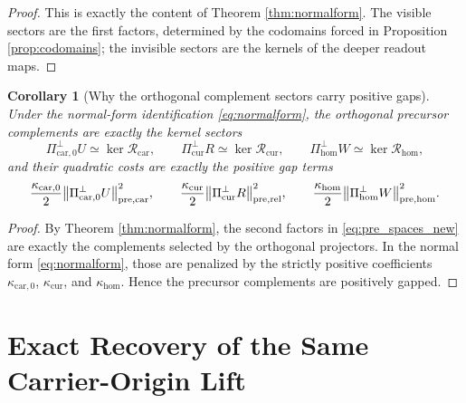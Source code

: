 \documentclass[11pt]{article}
\newcommand{\PreTensor}{U}
\newcommand{\PreRelabel}{R}
\newcommand{\PreFree}{W}
\newcommand{\PreCarPerp}{\Pi_{\mathrm{car},0}^{\perp}}
\newcommand{\CurrentPerp}{\Pi_{\mathrm{cur}}^{\perp}}
\newcommand{\FreeReadPerp}{\Pi_{\mathrm{hom}}^{\perp}}
\newcommand{\PreCarGap}{\kappa_{\mathrm{car},0}}
\newcommand{\CurrentGap}{\kappa_{\mathrm{cur}}}
\newcommand{\HomGap}{\kappa_{\mathrm{hom}}}
\newcommand{\CarRead}{\mathcal R_{\mathrm{car}}}
\newcommand{\CurRead}{\mathcal R_{\mathrm{cur}}}
\newcommand{\HomRead}{\mathcal R_{\mathrm{hom}}}
\newtheorem{corollary}{Corollary}
\begin{document}
\begin{proof}
This is exactly the content of Theorem \ref{thm:normalform}. The visible sectors are the first factors, determined by the codomains forced in Proposition \ref{prop:codomains}; the invisible sectors are the kernels of the deeper readout maps.
\end{proof}

\begin{corollary}[Why the orthogonal complement sectors carry positive gaps]
\label{cor:gaps}
Under the normal-form identification \eqref{eq:normalform}, the orthogonal precursor complements are exactly the kernel sectors
\[
\PreCarPerp\PreTensor\simeq \ker\CarRead,
\qquad
\CurrentPerp\PreRelabel\simeq \ker\CurRead,
\qquad
\FreeReadPerp\PreFree\simeq \ker\HomRead,
\]
and their quadratic costs are exactly the positive gap terms
\[
\frac{\PreCarGap}{2}\norm{\PreCarPerp\PreTensor}_{\mathrm{pre,car}}^2,
\qquad
\frac{\CurrentGap}{2}\norm{\CurrentPerp\PreRelabel}_{\mathrm{pre,rel}}^2,
\qquad
\frac{\HomGap}{2}\norm{\FreeReadPerp\PreFree}_{\mathrm{pre,hom}}^2.
\]
\end{corollary}

\begin{proof}
By Theorem \ref{thm:normalform}, the second factors in \eqref{eq:pre_spaces_new} are exactly the complements selected by the orthogonal projectors. In the normal form \eqref{eq:normalform}, those are penalized by the strictly positive coefficients \(\PreCarGap\), \(\CurrentGap\), and \(\HomGap\). Hence the precursor complements are positively gapped.
\end{proof}

\section{Exact Recovery of the Same Carrier-Origin Lift}
\end{document}
